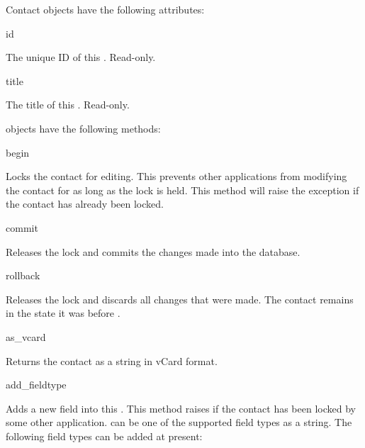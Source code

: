 \begin{classdesc*}{Contact}
 objects have the following attributes:

\begin{memberdesc}[Contact]{id}

The unique ID of this . Read-only.

\end{memberdesc}

\begin{memberdesc}[Contact]{title}

The title of this . Read-only.

\end{memberdesc}

 objects have the following methods:

\begin{methoddesc}[Contact]{begin}{}

Locks the contact for editing. This prevents other applications from 
modifying the contact for as long as the lock is held. This method will 
raise the exception  if the contact has already been 
locked.

\end{methoddesc}

\begin{methoddesc}[Contact]{commit}{}

Releases the lock and commits the changes made into the database.

\end{methoddesc}

\begin{methoddesc}[Contact]{rollback}{}

Releases the lock and discards all changes that were made. The contact 
remains in the state it was before .

\end{methoddesc}

\begin{methoddesc}[Contact]{as_vcard}{}

Returns the contact as a string in vCard format.

\end{methoddesc}

\begin{methoddesc}[Contact]{add_field}{type }

Adds a new field into this . This method raises 
 if the contact has been locked by some other 
application.  can be one of the supported field types as a 
string. The following field types can be added at present:


\end{methoddesc}
\end{classdesc*}
